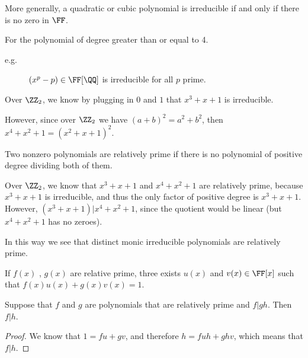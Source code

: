 \documentclass[11pt]{scrartcl}
\begin{document}
More generally, a quadratic or cubic polynomial is irreducible if and only if there is no zero in $\FF$.

For the polynomial of degree greater than or equal to 4.

\begin{description}

\item[e.g.] $(x^p-p)\in\FF[\QQ]$ is irreducible for all $p$ prime.

\end{description}

\begin{example}

Over $\ZZ_2$, we know by plugging in $0$ and $1$ that $x^3+x+1$ is irreducible.

However, since over $\ZZ_2$ we have $(a+b)^2=a^2+b^2$, then $x^4+x^2+1 = (x^2+x+1)^2$.
\end{example}

\begin{definition}
Two nonzero polynomials are relatively prime if there is no polynomial of positive degree dividing both of them.
\end{definition}

\begin{example}

Over $\ZZ_2$, we know that $x^3+x+1$ and $x^4+x^2+1$ are relatively prime, because $x^3+x+1$ is irreducible, and thus the only factor of positive degree is $x^3+x+1$. However, $(x^3+x+1) | x^4+x^2+1$, since the quotient would be linear (but $x^4+x^2+1$ has no zeroes).
\end{example} 

\begin{remark}
In this way we see that distinct monic irreducible polynomials are relatively prime.
\end{remark}

\begin{theorem}
  If $f(x)$ , $g(x)$ are relative prime, three exists $u(x)$ and
  $v(x) \in\FF[x]$ such that $f(x)u(x) +g(x)v(x) = 1$.
\end{theorem}

\begin{lemma}
Suppose that $f$ and $g$ are polynomials that are relatively prime and $f|gh$. Then $f|h$.
\end{lemma}
\begin{proof}
  \hfill

We know that $1= fu + gv$, and therefore $h = fuh + ghv$, which means that $f|h$.
\end{proof}
\end{document}
